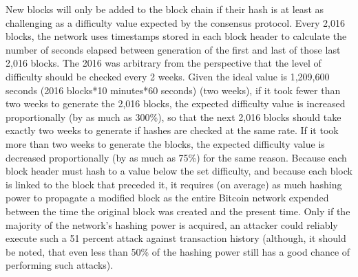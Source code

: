 New blocks will only be added to the block chain if their hash is at least as challenging as a difficulty value expected by the consensus protocol. Every 2,016 blocks, the network uses timestamps stored in each block header to calculate the number of seconds elapsed between generation of the first and last of those last 2,016 blocks. The 2016 was arbitrary from the perspective that the level of difficulty should be checked every 2 weeks. Given the ideal value is 1,209,600 seconds (2016 blocks*10 minutes*60 seconds) (two weeks), if it took fewer than two weeks to generate the 2,016 blocks, the expected difficulty value is increased proportionally (by as much as 300\%), so that the next 2,016 blocks should take exactly two weeks to generate if hashes are checked at the same rate. If it took more than two weeks to generate the blocks, the expected difficulty value is decreased proportionally (by as much as 75\%) for the same reason. Because each block header must hash to a value below the set difficulty, and because each block is linked to the block that preceded it, it requires (on average) as much hashing power to propagate a modified block as the entire Bitcoin network expended between the time the original block was created and the present time. Only if the majority of the network’s hashing power is acquired, an attacker could reliably execute such a 51 percent attack against transaction history (although, it should be noted, that even less than 50\% of the hashing power still has a good chance of performing such attacks).
\newpage
